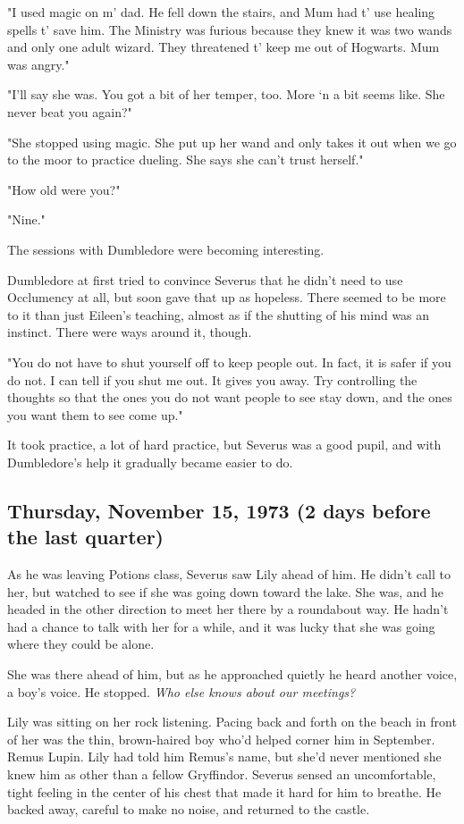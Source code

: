 "I used magic on m' dad. He fell down the stairs, and Mum had t' use healing spells t' save him. The Ministry was furious because they knew it was two wands and only one adult wizard. They threatened t' keep me out of Hogwarts. Mum was{\el} angry."

"I'll say she was. You got a bit of her temper, too. More `n a bit seems like. She never beat you again?"

"She stopped using magic. She put up her wand and only takes it out when we go to the moor to practice dueling. She says she can't trust herself."

"How old were you?"

"Nine."

The sessions with Dumbledore were becoming interesting.

Dumbledore at first tried to convince Severus that he didn't need to use Occlumency at all, but soon gave that up as hopeless. There seemed to be more to it than just Eileen's teaching, almost as if the shutting of his mind was an instinct. There were ways around it, though.

"You do not have to shut yourself off to keep people out. In fact, it is safer if you do not. I can tell if you shut me out. It gives you away. Try controlling the thoughts so that the ones you do not want people to see stay down, and the ones you want them to see come up."

It took practice, a lot of hard practice, but Severus was a good pupil, and with Dumbledore's help it gradually became easier to do.

\subsection{Thursday, November 15, 1973 (2 days before the last quarter)}

As he was leaving Potions class, Severus saw Lily ahead of him. He didn't call to her, but watched to see if she was going down toward the lake. She was, and he headed in the other direction to meet her there by a roundabout way. He hadn't had a chance to talk with her for a while, and it was lucky that she was going where they could be alone.

She was there ahead of him, but as he approached quietly he heard another voice, a boy's voice. He stopped. \emph{Who else knows about our meetings?}

Lily was sitting on her rock listening. Pacing back and forth on the beach in front of her was the thin, brown-haired boy who'd helped corner him in September. Remus Lupin. Lily had told him Remus's name, but she'd never mentioned she knew him as other than a fellow Gryffindor. Severus sensed an uncomfortable, tight feeling in the center of his chest that made it hard for him to breathe. He backed away, careful to make no noise, and returned to the castle.

